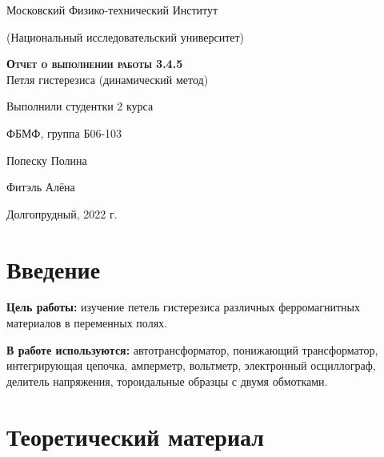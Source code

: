 \documentclass[12pt,a4paper]{article}
\begin{document}
\begin{titlepage}
  \begin{center}
    \huge
    Московский Физико-технический Институт
    
    (Национальный исследовательский университет)
    \vspace{0.5cm}

   
    \vspace{0.25cm}
 
    \vfill
 
    \vfill

    \textsc{\bf{Отчет о выполнении работы 3.4.5}}\\[3mm]
    
    {\LARGE Петля гистерезиса (динамический метод)}
  \bigskip
    \vfill
    
\end{center}
\vfill
\begin{flushright}

    Выполнили студентки 2 курса
    
    ФБМФ, группа Б06-103

    Попеску Полина
    
    
    Фитэль Алёна

\end{flushright}
\bigskip


\vfill

\begin{center}
  Долгопрудный, 2022 г.
\end{center}
\end{titlepage}

\section{Введение}


\textbf{Цель работы:} изучение петель гистерезиса различных ферромагнитных
материалов в переменных полях.

\textbf{В работе используются:} автотрансформатор, понижающий
трансформатор, интегрирующая цепочка, амперметр, вольтметр,
электронный осциллограф, делитель напряжения, тороидальные образцы с
двумя обмотками.

\section{Теоретический материал}
\end{document}
